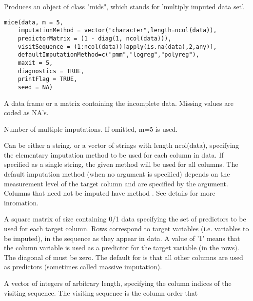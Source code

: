 \documentclass{article}
\begin{document}
\begin{Description}\relax
Produces an object of class "mids", which stands
for 'multiply imputed data set'.
\end{Description}
\begin{Usage}
\begin{verbatim}
mice(data, m = 5, 
    imputationMethod = vector("character",length=ncol(data)), 
    predictorMatrix = (1 - diag(1, ncol(data))),
    visitSequence = (1:ncol(data))[apply(is.na(data),2,any)], 
    defaultImputationMethod=c("pmm","logreg","polyreg"),
    maxit = 5, 
    diagnostics = TRUE, 
    printFlag = TRUE,
    seed = NA)
\end{verbatim}
\end{Usage}
\begin{Arguments}
\begin{ldescription}
\item[\code{data}] A data frame or a matrix containing the incomplete
data. Missing values are coded as NA's.
\item[\code{m}] Number of multiple imputations.
If omitted, m=5 is used.
\item[\code{imputationMethod}] Can be either a string,
or a vector of strings with length ncol(data),
specifying the elementary imputation method to be used
for each column in data. If specified as a single
string, the given method will be used for all columns.
The default imputation method (when no argument is specified)
depends on the measurement level of the target column and
are specified by the  argument.
Columns that need not be imputed have method .
See details for more inromation.
\item[\code{predictorMatrix}] A square matrix of size  containing 0/1 data specifying
the set of predictors to be used for each target column. Rows correspond
to target variables (i.e. variables to be imputed), in the sequence as
they appear in data. A value of '1' means that the column variable is
used as a predictor for the target variable (in the rows). The diagonal
of  must be zero. The default for  is that
all other columns are used as predictors (sometimes called massive
imputation).
\item[\code{visitSequence}] A vector of integers of arbitrary length, specifying the column indices
of the visiting sequence. The visiting sequence is the column order that

\end{ldescription}
\end{Arguments}
\end{document}
